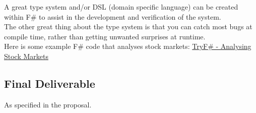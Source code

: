 \documentclass{article}
\begin{document}
	A great type system and/or DSL (domain specific language) can be created within F\# to assist in the development and verification of the system.\\

	The other great thing about the type system is that you can catch most bugs at compile time, rather than getting unwanted surprises at runtime. \\

	Here is some example F\# code that analyses stock markets: \href{http://www.tryfsharp.org/Learn/financial-computing#analyzing-stock-markets}{TryF\# - Analysing Stock Markets}

	\subsection{Final Deliverable}
	As specified in the proposal.
\end{document}
